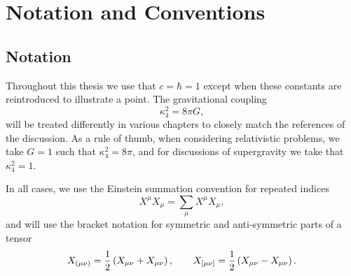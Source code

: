 \chapter{Notation and Conventions}
\label{app:conventions}

\section{Notation}
Throughout this thesis we use that $c = \hbar = 1$ except when these constants are reintroduced to illustrate a point. The gravitational coupling
\begin{equation*}
	\kappa_4^2 = 8 \pi G,
\end{equation*}
will be treated differently in various chapters to closely match the references of the discussion. As a rule of thumb, when considering relativistic problems, we take $G = 1$ such that $\kappa_4^2 = 8\pi$, and for discussions of supergravity we take that $\kappa_4^2 = 1$. 

In all cases, we use the Einstein summation convention for repeated indices
\begin{equation*}
	X^\mu X_\mu  = \sum_{\mu} X^\mu X_\mu,
\end{equation*} 
and will use the bracket notation for symmetric and anti-symmetric parts of a tensor
\begin{equation*}
	X_{(\mu \nu)} = \frac{1}{2} \left(X_{\mu \nu} + X_{\mu \nu} \right), \qquad 	X_{[\mu \nu]} = \frac{1}{2} \left(X_{\mu \nu} - X_{\mu \nu} \right).
\end{equation*}

